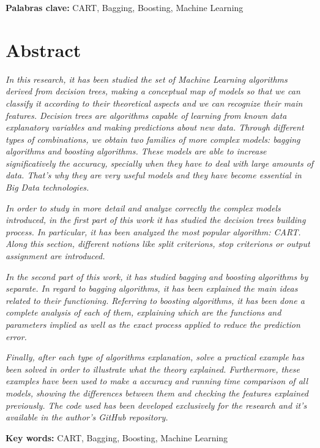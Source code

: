 \documentclass[12pt,twoside]{article}
\begin{document}
\textbf{Palabras clave:} CART, Bagging, Boosting, Machine Learning



\newpage



\section*{Abstract}

\emph{In this research, it has been studied the set of Machine Learning algorithms derived from decision trees, making a conceptual map of models so that we can classify it according to their theoretical aspects and we can recognize their main features. Decision trees are algorithms capable of learning from known data explanatory variables and making predictions about new data. Through different types of combinations, we obtain two families of more complex models: bagging algorithms and boosting algorithms. These models are able to increase significatively the accuracy, specially when they have to deal with large amounts of data. That's why they are very useful models and they have become essential in Big Data technologies.}

\emph{In order to study in more detail and analyze correctly the complex models introduced, in the first part of this work it has studied the decision trees building process. In particular, it has been analyzed the most popular algorithm: CART. Along this section, different notions like split criterions, stop criterions or output assignment are introduced.}

\emph{In the second part of this work, it has studied bagging and boosting algorithms by separate. In regard to bagging algorithms, it has been explained the main ideas related to their functioning. Referring to boosting algorithms, it has been done a complete analysis of each of them, explaining which are the functions and parameters implied as well as the exact process applied to reduce the prediction error.}

\emph{Finally, after each type of algorithms explanation, solve a practical example has been solved in order to illustrate what the theory explained. Furthermore, these examples have been used to make a accuracy and running time comparison of all models, showing the differences between them and checking the features explained previously. The code used has been developed exclusively for the research and it's available in the author's GitHub repository.}

\textbf{Key words:} CART, Bagging, Boosting, Machine Learning
\end{document}
